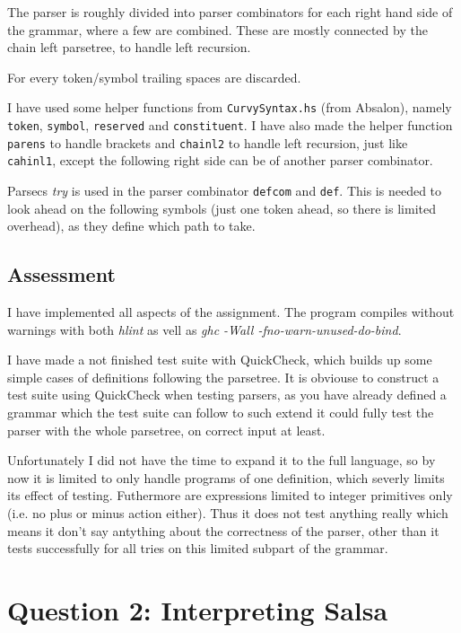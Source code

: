 \documentclass[a4paper, 10pt]{article}
\begin{document}
The parser is roughly divided into parser combinators for each right hand side of the grammar, where a few are combined.
These are mostly connected by the chain left parsetree, to handle left recursion.

For every token/symbol trailing spaces are discarded.

I have used some helper functions from \texttt{CurvySyntax.hs} (from Absalon), namely \texttt{token}, \texttt{symbol}, \texttt{reserved} and \texttt{constituent}. I have also made the helper function \texttt{parens} to handle brackets and \texttt{chainl2} to handle left recursion, just like \texttt{cahinl1}, except the following right side can be of another parser combinator.

Parsecs \textit{try} is used in the parser combinator \texttt{defcom} and \texttt{def}. This is needed to look ahead on the following symbols (just one token ahead, so there is limited overhead), as they define which path to take. %


\subsection{Assessment}
I have implemented all aspects of the assignment.
The program compiles without warnings with both \textit{hlint} as vell as \textit{ghc -Wall -fno-warn-unused-do-bind}.

I have made a not finished test suite with QuickCheck, which builds up some simple cases of definitions following the parsetree. It is obviouse to construct a test suite using QuickCheck when testing parsers, as you have already defined a grammar which the test suite can follow to such extend it could fully test the parser with the whole parsetree, on correct input at least.

Unfortunately I did not have the time to expand it to the full language, so by now it is limited to only handle programs of one definition, which severly limits its effect of testing. Futhermore are expressions limited to integer primitives only (i.e. no plus or minus action either). Thus it does not test anything really which means it don't say antything about the correctness of the parser, other than it tests successfully for all tries on this limited subpart of the grammar.


\section{Question 2: Interpreting Salsa}
\end{document}
